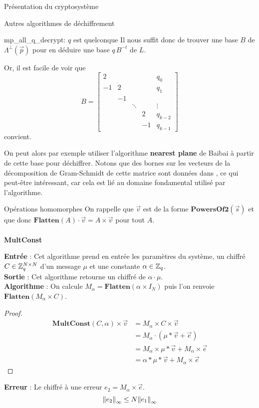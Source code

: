\begin{section}{Présentation du cryptosystème}
\begin{subsection}{Autres algorithmes de déchiffrement}
\begin{subsubsection}{mp\_all\_q\_decrypt: $q$ est quelconque}
	Il nous suffit donc de trouver une base $B$ de $\Lambda^\bot\left(\vec{p}\right)$ pour en déduire une base $q \, B^{-t}$ de $L$.

	Or, il est facile de voir que
\[ B = \begin{bmatrix} 
	2 & &&& q_0\\  
	-1 & 2 &&& q_1\\
   & -1 \\ 
	&    & \ddots & & \vdots \\
	&    &       &  2 & q_{k-2} \\
	&    &       &  -1 & q_{k-1}
\end{bmatrix}\]
convient.

On peut alors par exemple utiliser l'algorithme \textbf{nearest plane} de Baibai à partir de cette base pour déchiffrer. Notons que des bornes sur les vecteurs de la décomposition de Gram-Schmidt de cette matrice sont données dans \cite{EC:MicPei12}, ce qui peut-être intéressant, car cela est lié au domaine fondamental utilisé par l'algorithme.

\end{subsubsection}	
\end{subsection}

\begin{subsection}{Opérations homomorphes}
	On rappelle que $\vec{v}$ est de la forme $\textbf{PowersOf2}(\vec{s})$ et que donc $\textbf{Flatten}(A) \cdot \vec{v} = A \times \vec{v}$ pour tout $A$.
	
	\paragraph{}
	\textbf{MultConst}
	\flushleft
	
	\textbf{Entrée} : Cet algorithme prend en entrée les paramètres du système, un chiffré $C \in \mathbb{Z}_q^{N \times N}$ d'un message $\mu$ et une constante $\alpha \in \mathbb{Z}_q$. \\
	\textbf{Sortie} : Cet algorithme retourne un chiffré de $\alpha \cdot \mu$.\\
	\textbf{Algorithme} : On calcule $M_{\alpha} = \textbf{Flatten}(\alpha \times I_N)$ puis l'on renvoie $\textbf{Flatten}(M_{\alpha} \times C)$.
	\begin{proof}
	\begin{align*}
	\textbf{MultConst}(C, \alpha) \times \vec{v} &= M_{\alpha} \times C \times \vec{v} \\
	&= M_{\alpha} \cdot (\mu * \vec{v} + \vec{e}) \\
	&= M_{\alpha} \times \mu * \vec{v} + M_{\alpha} \times \vec{e} \\
	&= \alpha * \mu * \vec{v} + M_{\alpha} \times \vec{e}
	\end{align*}
	\end{proof}
	\textbf{Erreur} : Le chiffré à une erreur $e_2 = M_\alpha \times
		\vec{e}$. 
		\[{\|e_2\|}_{\infty} \leq N {\|e_1\|}_{\infty}\]

\end{subsection}
\end{section}
